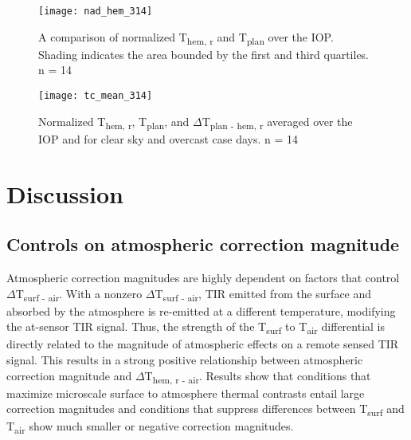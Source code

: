 \begin{figure}[H]
	\centering
	\texttt{[image: nad\_hem\_314]}
	\caption{A comparison of normalized T\textsubscript{hem, r} and T\textsubscript{plan} over the IOP. Shading indicates the area bounded by the first and third quartiles. n = 14}
	\label{tc_nadhem}
\end{figure}



\begin{figure}[H]
	\centering
	\texttt{[image: tc\_mean\_314]}
	\caption{Normalized T\textsubscript{hem, r}, T\textsubscript{plan}, and $\Delta$T\textsubscript{plan - hem, r} averaged over the IOP and for clear sky and overcast case days. n = 14}
	\label{tc_mean2}
\end{figure}

\section{Discussion}

\subsection{Controls on atmospheric correction magnitude}

Atmospheric correction magnitudes are highly dependent on factors that control $\Delta$T\textsubscript{surf - air}. With a nonzero $\Delta$T\textsubscript{surf - air}, TIR emitted from the surface and absorbed by the atmosphere is re-emitted at a different temperature, modifying the at-sensor TIR signal. Thus, the strength of the T\textsubscript{surf} to T\textsubscript{air} differential is directly related to the magnitude of atmospheric effects on a remote sensed TIR signal. This results in a strong positive relationship between atmospheric correction magnitude and $\Delta$T\textsubscript{hem, r - air}. Results show that conditions that maximize microscale surface to atmosphere thermal contrasts entail large correction magnitudes and conditions that suppress differences between T\textsubscript{surf} and T\textsubscript{air} show much smaller or negative correction magnitudes.

